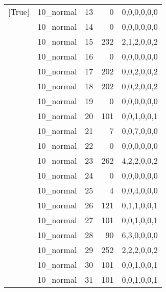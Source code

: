 \begin{tabular}{llrrl}
 [True]          & 10\_normal           &            13 &                     0 & 0,0,0,0,0,0   \\
 [True]          & 10\_normal           &            14 &                     0 & 0,0,0,0,0,0   \\
 [True]          & 10\_normal           &            15 &                   232 & 2,1,2,0,0,2   \\
 [True]          & 10\_normal           &            16 &                     0 & 0,0,0,0,0,0   \\
 [True]          & 10\_normal           &            17 &                   202 & 0,0,2,0,0,2   \\
 [True]          & 10\_normal           &            18 &                   202 & 0,0,2,0,0,2   \\
 [True]          & 10\_normal           &            19 &                     0 & 0,0,0,0,0,0   \\
 [True]          & 10\_normal           &            20 &                   101 & 0,0,1,0,0,1   \\
 [True]          & 10\_normal           &            21 &                     7 & 0,0,7,0,0,0   \\
 [True]          & 10\_normal           &            22 &                     0 & 0,0,0,0,0,0   \\
 [True]          & 10\_normal           &            23 &                   262 & 4,2,2,0,0,2   \\
 [True]          & 10\_normal           &            24 &                     0 & 0,0,0,0,0,0   \\
 [True]          & 10\_normal           &            25 &                     4 & 0,0,4,0,0,0   \\
 [True]          & 10\_normal           &            26 &                   121 & 0,1,1,0,0,1   \\
 [True]          & 10\_normal           &            27 &                   101 & 0,0,1,0,0,1   \\
 [True]          & 10\_normal           &            28 &                    90 & 6,3,0,0,0,0   \\
 [True]          & 10\_normal           &            29 &                   252 & 2,2,2,0,0,2   \\
 [True]          & 10\_normal           &            30 &                   101 & 0,0,1,0,0,1   \\
 [True]          & 10\_normal           &            31 &                   101 & 0,0,1,0,0,1   \\

\end{tabular}
